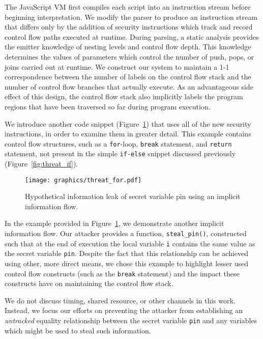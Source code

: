 \documentclass[preprint]{sigplanconf}
\begin{document}
The JavaScript VM first compiles each script into an instruction stream before beginning interpretation.
We modify the parser to produce an instruction stream that differs only by the addition of security instructions which track and record control flow paths executed at runtime.
During parsing, a static analysis provides the emitter knowledge of nesting levels and control flow depth.
This knowledge determines the values of parameters which control the number of push, pops, or joins carried out at runtime.
We construct our system to maintain a 1-1 correspondence between the number of labels on the control flow stack and the number of control flow branches that actually execute.
As an advantageous side effect of this design, the control flow stack also implicitly labels the program regions that have been traversed so far during program execution.

We introduce another code snippet (Figure~\ref{fig:threat_for}) that uses all of the new security instructions, in order to examine them in greater detail.
This example contains control flow structures, such as a \texttt{for}-loop, \texttt{break} statement, and \texttt{return} statement, not present in the simple \texttt{if-else} snippet discussed previously (Figure~\ref{fig:threat_if}).

\begin{figure}[ht]
  \centerline{\texttt{[image: graphics/threat\_for.pdf]}}
  \caption{Hypothetical information leak of secret variable pin using an implicit information flow.}
  \label{fig:threat_for}
\end{figure}

In the example provided in Figure~\ref{fig:threat_for}, we demonstrate another implicit information flow.
Our attacker provides a function, \texttt{steal\_pin()}, constructed such that at the end of execution the local variable \texttt{i} contains the same value as the secret variable \texttt{pin}.
Despite the fact that this relationship can be achieved using other, more direct means, we chose this example to highlight lesser used control flow constructs (such as the \texttt{break} statement) and the impact these constructs have on maintaining the control flow stack.

We do not discuss timing, shared resource, or other channels in this work.
Instead, we focus our efforts on preventing the attacker from establishing an \emph{untracked} equality relationship between the secret variable \texttt{pin} and any variables which might be used to steal such information.
\end{document}
